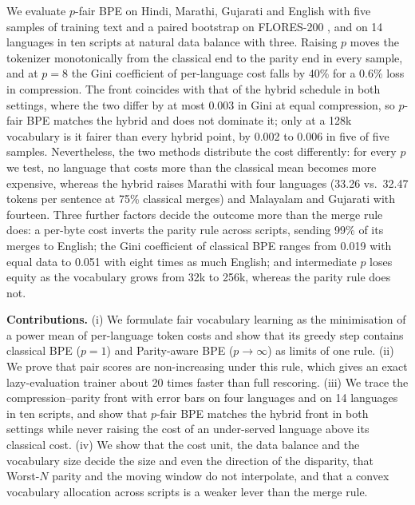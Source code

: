 We evaluate $p$-fair BPE on Hindi, Marathi, Gujarati and English with five samples of
training text and a paired bootstrap on FLORES-200 \citep{nllb2022}, and on 14 languages in
ten scripts at natural data balance with three. Raising $p$ moves the tokenizer monotonically from the classical end to the parity end in
every sample, and at $p=8$ the Gini coefficient of per-language cost falls by 40\% for a
0.6\% loss in compression. The front coincides with that of the hybrid schedule in both settings, where
the two differ by at most 0.003 in Gini at equal compression, so $p$-fair BPE matches the
hybrid and does not dominate it; only at a 128k vocabulary is it fairer than every hybrid
point, by 0.002 to 0.006 in five of five samples. Nevertheless, the two methods distribute
the cost differently: for every $p$ we test, no language that costs more than the classical
mean becomes more expensive, whereas the hybrid raises Marathi with four languages (33.26
vs.\ 32.47 tokens per sentence at 75\% classical merges) and Malayalam and Gujarati with
fourteen. Three further factors decide the outcome more than the merge rule does: a per-byte cost
inverts the parity rule across scripts, sending 99\% of its merges to English; the Gini
coefficient of classical BPE ranges from 0.019 with equal data to 0.051 with eight times as
much English; and intermediate $p$ loses equity as the vocabulary grows from 32k to 256k,
whereas the parity rule does not.

\noindent\textbf{Contributions.} (i) We formulate fair vocabulary learning as the
minimisation of a power mean of per-language token costs and show that its greedy step
contains classical BPE ($p=1$) and Parity-aware BPE ($p\to\infty$) as limits of one rule.
(ii) We prove that pair scores are non-increasing under this rule, which gives an exact
lazy-evaluation trainer about 20 times faster than full rescoring. (iii) We trace the
compression--parity front with error bars on four languages and on 14 languages in ten
scripts, and show that $p$-fair BPE matches the hybrid front in both settings while never
raising the cost of an under-served language above its classical cost. (iv) We show that
the cost unit, the data balance and the vocabulary size decide the size and even the
direction of the disparity, that Worst-$N$ parity and the moving window do not
interpolate, and that a convex vocabulary allocation across scripts is a weaker lever than
the merge rule.